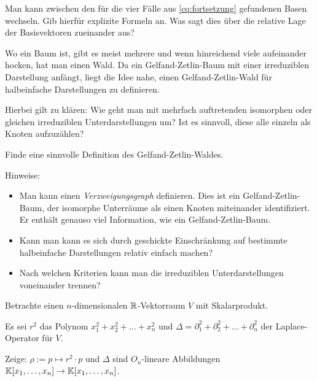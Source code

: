 \begin{sheet}
	\begin{problem}[title={Basiswechsel zwischen verschiedenen Gelfand-Zetlin-Basen}]
			Man kann zwischen den für die vier Fälle aus \ref{cq:fortsetzung} gefundenen Basen wechseln. Gib hierfür explizite Formeln an. Was sagt dies über die relative Lage der Basisvektoren zueinander aus?
	\end{problem}

	\begin{problem}[title={Gelfand-Zetlin-Wald}]
		Wo ein Baum ist, gibt es meist mehrere und wenn hinreichend viele aufeinander hocken, hat man einen Wald. Da ein Gelfand-Zetlin-Baum mit einer irreduziblen Darstellung anfängt, liegt die Idee nahe, einen Gelfand-Zetlin-Wald für halbeinfache Darstellungen zu definieren.
		
		Hierbei gilt zu klären: Wie geht man mit mehrfach auftretenden isomorphen oder gleichen irreduziblen Unterdarstellungen um? Ist es sinnvoll, diese alle einzeln als Knoten aufzuzählen?
		
		Finde eine sinnvolle Definition des Gelfand-Zetlin-Waldes.
		
		Hinweise:
		\begin{itemize}
		 \item Man kann einen \emph{Verzweigungsgraph} definieren. Dies ist ein Gelfand-Zetlin-Baum, der isomorphe Unterräume als einen Knoten miteinander identifiziert. Er enthält genauso viel Information, wie ein Gelfand-Zetlin-Baum.
		\item Kann man kann es sich durch geschickte Einschränkung auf bestimmte halbeinfache Darstellungen relativ einfach machen?
		\item Nach welchen Kriterien kann man die irreduziblen Unterdarstellungen voneinander trennen?
		\end{itemize}
	\end{problem}


\begin{problem}\label{gelfand_zetlin:ex:Delta_vs_rQuadrat}
Betrachte einen $n$-dimensionalen $\mathbb{R}$-Vektorraum $V$ mit Skalarprodukt.

Es sei $r^2$ das Polynom $x_1^2+x_2^2+\ldots+x_n^2$ und $\Delta=\partial_1^2 + \partial_2^2 +\ldots+\partial_n^2$ der Laplace-Operator für $V$.

\begin{subproblem}
Zeige: $\rho:=p\mapsto r^2\cdot p$ und $\Delta$ sind $O_n$-lineare Abbildungen $\mathbb{K}[x_1,\ldots,x_n]\to\mathbb{K}[x_1,\ldots,x_n]$.
\end{subproblem}


\end{problem}
\end{sheet}
